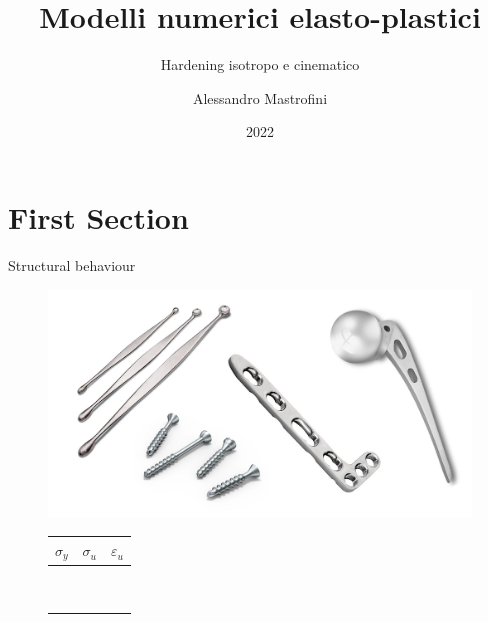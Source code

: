 \documentclass[aspectratio=169,xcolor=dvipsnames]{beamer}
\title[short title]{Modelli numerici elasto-plastici} %
\subtitle{Hardening isotropo e cinematico}
\author[Pin-Yen] {Alessandro Mastrofini}
\institute[NTU] %
{
Meccanica Computazionale dei Tessuti e Biomateriali \\
Università degli Studi di Roma Tor Vergata%
}
\date{2022} %
\begin{document}
\begin{frame}
    \titlepage
\end{frame}

\section{First Section}
\begin{frame}{Structural behaviour}
	\begin{figure}
		\begin{minipage}[c]{0.3\linewidth}
			\tiny{
\def\svgwidth{\linewidth}
}
		\end{minipage}\hfill
	\begin{minipage}[c]{0.3\linewidth}
		\tiny{
\def\svgwidth{\linewidth}
}
	\end{minipage}\hfill
\begin{minipage}{0.3\linewidth}
	\centering
	\includegraphics[width=\linewidth]{stainless_steell_biomedical.png}
\vfill
	\tiny{
\begin{tabular}{c|c|c}

	$\sigma_y$ & $\sigma_u$ & $\varepsilon_u$ \\
	\hline
	&  &  \\
	\hline
	&  &  \\
	\hline
	&  &  \\
	\hline
	&  &  \\
	\hline
	&  &  \\
	\hline
	&  &  \\
	\hline
	&  &  \\
	\hline
	&  &  \\
	\hline
	&  &  \\

\end{tabular}}\vfill
\end{minipage}\hfill

		\end{figure}
\end{frame}
\end{document}

